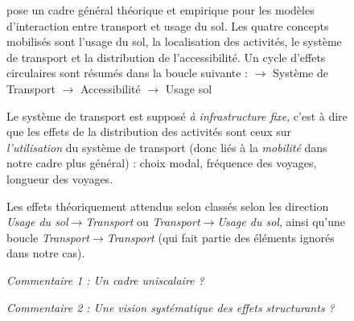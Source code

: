 \begin{figure}[h!]
	\begin{mdframed}
		
		\cite{wegener2004land} pose un cadre général théorique et empirique pour les modèles d'interaction entre transport et usage du sol. Les quatre concepts mobilisés sont l'usage du sol, la localisation des activités, le système de transport et la distribution de l'accessibilité. Un cycle d'effets circulaires sont résumés dans la boucle suivante :
		\medskip
		{\centering
		  $\longrightarrow$ Système de Transport $\longrightarrow$ Accessibilité $\longrightarrow$ Usage  sol
		}
		\medskip
		
		Le système de transport est supposé \emph{à infrastructure fixe}, c'est à dire que les effets de la distribution des activités sont ceux sur \emph{l'utilisation} du système de transport (donc liés à la \emph{mobilité} dans notre cadre plus général) : choix modal, fréquence des voyages, longueur des voyages.
		
		Les effets théoriquement attendus selon classés selon les direction \textit{Usage du sol}$\rightarrow$\textit{Transport} ou \textit{Transport}$\rightarrow$\textit{Usage du sol}, ainsi qu'une boucle \textit{Transport}$\rightarrow$\textit{Transport} (qui fait partie des éléments ignorés dans notre cas).
		
		\bigskip
		
		\textit{Commentaire 1 : Un cadre uniscalaire ?}
		
		\bigskip
		
		\textit{Commentaire 2 : Une vision systématique des effets structurants ?}
		
		
	\end{mdframed}
\end{figure}



